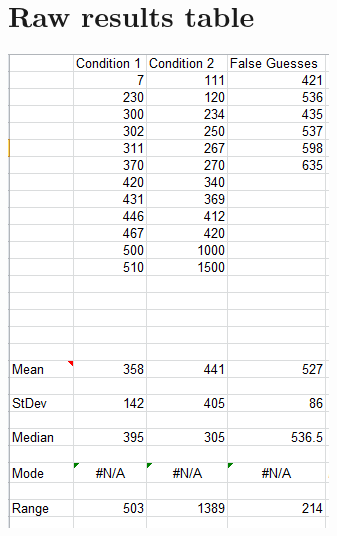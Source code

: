\documentclass{report}
\begin{document}
\chapter{Raw results table}
\includegraphics[width=\textwidth]{psych3}
\end{document}
